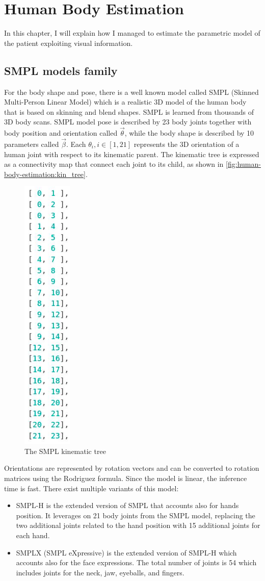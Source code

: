 \newpage
\chapter{Human Body Estimation}
In this chapter, I will explain how I managed to estimate the parametric model of the patient exploiting visual information.

\section{SMPL models family}
For the body shape and pose, there is a well known model called SMPL (Skinned Multi-Person Linear Model) \cite{SMPL:2015} which is a realistic 3D model of the human body that is based on skinning and blend shapes. SMPL is learned from thousands of 3D body scans. SMPL model pose is described by 23 body joints together with body position and orientation called $\vec{\theta}$, while the body shape is described by 10 parameters called $\vec{\beta}$. Each $\theta_i, i \in [1,21] $ represents the 3D orientation of a human joint with respect to its kinematic parent. The kinematic tree is expressed as a connectivity map that connect each joint to its child, as shown in \autoref{fig:human-body-estimation:kin_tree}.
\begin{figure}[h]
    \centering
    \includegraphics[width=0.07\linewidth]{images/kinematic_tree.png}
    \caption{The SMPL kinematic tree}
    \label{fig:human-body-estimation:kin_tree}
\end{figure}
Orientations are represented by rotation vectors and can be converted to rotation matrices using the Rodriguez formula. %
Since the model is linear, the inference time is fast.
There exist multiple variants of this model:
\begin{itemize}
    \item SMPL-H\cite{MANO:SIGGRAPHASIA:2017} is the extended version of SMPL that accounts also for hands position. It leverages on 21 body joints from the SMPL model, replacing the two additional joints related to the hand position with 15 additional joints for each hand.
    \item SMPLX\cite{SMPL-X:2019} (SMPL eXpressive) is the extended version of SMPL-H which accounts also for the face expressions. The total number of joints is 54 which includes joints for the neck, jaw, eyeballs, and fingers. 
\end{itemize}
